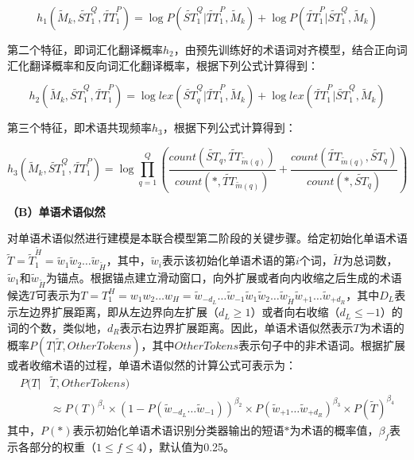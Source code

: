 \begin{equation}
h_1(\widetilde{M}_k, \widetilde{ST}_1^Q, \widetilde{TT}_1^P) = 
\log P(\widetilde{ST}_1^Q | \widetilde{TT}_1^P, \widetilde{M}_k)+\log P(\widetilde{TT}_1^P | \widetilde{ST}_1^Q, \widetilde{M}_k) 
\end{equation}

第二个特征，即词汇化翻译概率$h_2$，由预先训练好的术语词对齐模型，结合正向词汇化翻译概率和反向词汇化翻译概率，根据下列公式计算得到：

\begin{equation}
h_2(\widetilde{M}_k, \widetilde{ST}_1^Q, \widetilde{TT}_1^P)
= \log lex(\widetilde{ST}_q^Q | \widetilde{TT}_1^P,\widetilde{M}_k) + \log lex(\widetilde{TT}_1^P | \widetilde{ST}_1^Q, \widetilde{M}_k)
\end{equation}

第三个特征，即术语共现频率$h_3$，根据下列公式计算得到：

\begin{equation}
h_3(\widetilde{M}_k, \widetilde{ST}_1^Q, \widetilde{TT}_1^P)
= \log \prod_{q=1}^{Q} \left(\frac{count(\widetilde{ST}_q, \widetilde{TT}_{\widetilde{m}(q)})}{count(*,\widetilde{TT}_{\widetilde{m}(q)})} + \frac{count(\widetilde{TT}_{\widetilde{m}(q)},\widetilde{ST}_q)}{count(*,\widetilde{ST}_q)} \right)
\end{equation}

\textbf{（B）单语术语似然}

对单语术语似然进行建模是本联合模型第二阶段的关键步骤。给定初始化单语术语$\widetilde{T}=\widetilde{T}_1^{\widetilde{H}}=\widetilde{w}_1\widetilde{w}_2\ldots\widetilde{w}_{\widetilde{H}}$，其中，$\widetilde{w}_i$表示该初始化单语术语的第$i$个词，$\widetilde{H}$为总词数，$\tilde{w}_1$和$\tilde{w}_{\widetilde{H}}$为锚点。根据锚点建立滑动窗口，向外扩展或者向内收缩之后生成的术语候选$T$可表示为$ T=T_1^H=w_1w_2\ldots w_H= \widetilde{w}_{-d_L} \ldots \widetilde{w}_{-1}\widetilde{w}_1\widetilde{w}_2 \ldots 
\widetilde{w}_{\widetilde{H}}\widetilde{w}_{+1} \ldots \widetilde{w}_{+d_R}$，其中$D_L$表示左边界扩展距离，即从左边界向左扩展（$d_L \ge 1$）或者向右收缩（$d_L \le -1$）的词的个数，类似地，$d_R$表示右边界扩展距离。因此，单语术语似然表示$T$为术语的概率$P(T|\widetilde{T}, OtherTokens)$，其中$OtherTokens $表示句子中的非术语词。根据扩展或者收缩术语的过程，单语术语似然的计算公式可表示为：
\begin{equation}
\begin{aligned}
P(T|&\widetilde{T}, OtherTokens) \\
& \approx P(T)^{\beta_1} \times (1-P(\widetilde{w}_{-d_L}\ldots\widetilde{w}_{-1}))^{\beta_2} 
\times P(\widetilde{w}_{+1}\ldots\widetilde{w}_{+d_R})^{\beta_3} \times P(\widetilde{T})^{\beta_4}
\end{aligned}
\end{equation}
其中，$P(*)$表示初始化单语术语识别分类器输出的短语$*$为术语的概率值，$\beta_f$表示各部分的权重（$1\le f\le 4$），默认值为0.25。

